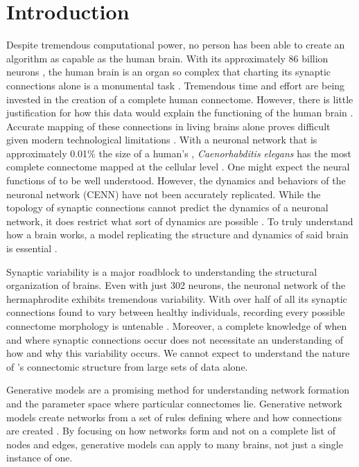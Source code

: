 \section{Introduction}

Despite tremendous computational power, no person has been able to create an algorithm as capable as the human brain. 
With its approximately 86 billion neurons \citep{Azevedo}, the human brain is an organ so complex that charting its synaptic connections alone is a monumental task \citep{VanEssen}. 
Tremendous time and effort are being invested in the creation of a complete human connectome. However, there is little justification for how this data would explain the functioning of the human brain \citep{Ceylan, Rheault}. 
Accurate mapping of these connections in living brains alone proves difficult given modern technological limitations \citep{Rheault}. 
With a neuronal network that is approximately 0.01\% the size of a human’s \citep{Azevedo}, \textit{Caenorhabditis elegans} has the most complete connectome mapped at the cellular level \citep{White}. 
One might expect the neural functions of \ce to be well understood. 
However, the dynamics and behaviors of the \ce neuronal network (CENN) have not been accurately replicated. 
While the topology of synaptic connections cannot predict the dynamics of a neuronal network, it does restrict what sort of dynamics are possible \citep{Prinz}.
To truly understand how a brain works, a model replicating the structure and dynamics of said brain is essential \citep{Izquierdo}.

Synaptic variability is a major roadblock to understanding the structural organization of brains. 
Even with just 302 neurons, the neuronal network of the hermaphrodite \ce exhibits tremendous variability. 
With over half of all its synaptic connections found to vary between healthy individuals, recording every possible \ce connectome morphology is untenable \citep{Witvliet}.
Moreover, a complete knowledge of when and where synaptic connections  occur does not necessitate an understanding of how and why this variability occurs. 
We cannot expect to understand the nature of \ce's connectomic structure from large sets of data alone.

Generative models are a promising method for understanding network formation and the parameter space where particular connectomes lie. 
Generative network models create networks from a set of rules defining where and how connections are created \citep{Betzel}. 
By focusing on how networks form and not on a complete list of nodes and edges, generative models can apply to many brains, not just a single instance of one. 

